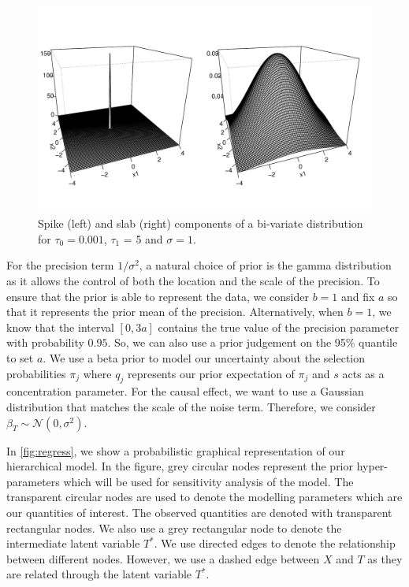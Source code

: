 \documentclass[preprint,12pt]{elsarticle}
\newcommand{\normal}{\mathcal{N}}
\begin{document}
\begin{figure}[h]
	\begin{center}
		\includegraphics[width = 0.95\linewidth]{spike_slab_bi.pdf}
	\end{center}
	\caption{Spike (left) and slab (right) components of a bi-variate distribution for $\tau_0 = 0.001$, $\tau_1$ = 5 and $\sigma=1$.}
	\label{fig:ssbl}
\end{figure}

For the precision term $1/\sigma^2$, a natural choice of prior is the gamma distribution
as it allows the control of both the location and the scale of the precision.
To ensure that the prior is able to represent the data, we consider $b=1$ and 
fix $a$ so that it represents the prior mean of the precision.
Alternatively, when $b=1$, we know that the interval
$[0, 3a]$ contains the true value of the precision parameter with probability $0.95$.
So, we can also use a prior judgement on the 95\% quantile to set $a$.
We use a beta prior to
model our uncertainty about
the selection probabilities $\pi_j$ where  $q_j$ represents our prior expectation of $\pi_j$ and $s$ acts as 
a concentration parameter.
For the causal effect, we want to use a Gaussian distribution that 
matches the scale of the noise term. Therefore, we consider $\beta_T\sim \normal(0,\sigma^2)$. 

In \cref{fig:regress}, we show a probabilistic graphical representation
of our hierarchical model. In the figure, grey circular nodes represent the
prior hyper-parameters which will be used for sensitivity analysis
of the model. The transparent circular nodes are used to denote
the modelling parameters which are our quantities of interest. 
The observed quantities are denoted with transparent rectangular
nodes. We also use a grey rectangular node to denote the intermediate
latent variable $T^*$. We use directed edges to denote the
relationship between different nodes. However, we use a dashed
edge between $X$ and $T$ as they are related through the latent
variable $T^*$. 
\end{document}
